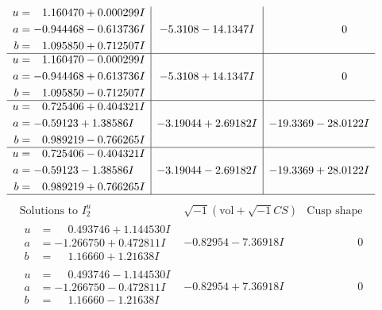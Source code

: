 \documentclass[1p]{elsarticle_modified}
\theoremstyle{definition}
\newcommand{\I}{\sqrt{-1}}
\begin{document}
$$\begin{array}{c|c|c}
\begin{aligned}
u &= \phantom{-}1.160470 + 0.000299 I \\
a &= -0.944468 - 0.613736 I \\
b &= \phantom{-}1.095850 + 0.712507 I\end{aligned}
 & -5.3108 - 14.1347 I & \phantom{-0.000000 } 0 \\ \hline\begin{aligned}
u &= \phantom{-}1.160470 - 0.000299 I \\
a &= -0.944468 + 0.613736 I \\
b &= \phantom{-}1.095850 - 0.712507 I\end{aligned}
 & -5.3108 + 14.1347 I & \phantom{-0.000000 } 0 \\ \hline\begin{aligned}
u &= \phantom{-}0.725406 + 0.404321 I \\
a &= -0.59123 + 1.38586 I \\
b &= \phantom{-}0.989219 - 0.766265 I\end{aligned}
 & -3.19044 + 2.69182 I & -19.3369 - 28.0122 I \\ \hline\begin{aligned}
u &= \phantom{-}0.725406 - 0.404321 I \\
a &= -0.59123 - 1.38586 I \\
b &= \phantom{-}0.989219 + 0.766265 I\end{aligned}
 & -3.19044 - 2.69182 I & -19.3369 + 28.0122 I\\
 \hline 
 \end{array}$$\newpage$$\begin{array}{c|c|c}  
\text{Solutions to }I^u_{2}& \I (\text{vol} + \sqrt{-1}CS) & \text{Cusp shape}\\
 \hline 
\begin{aligned}
u &= \phantom{-}0.493746 + 1.144530 I \\
a &= -1.266750 + 0.472811 I \\
b &= \phantom{-}1.16660 + 1.21638 I\end{aligned}
 & -0.82954 - 7.36918 I & \phantom{-0.000000 } 0 \\ \hline\begin{aligned}
u &= \phantom{-}0.493746 - 1.144530 I \\
a &= -1.266750 - 0.472811 I \\
b &= \phantom{-}1.16660 - 1.21638 I\end{aligned}
 & -0.82954 + 7.36918 I & \phantom{-0.000000 } 0 \\ \hline\begin{aligned}

\end{aligned}
\end{array}$$
\end{document}
